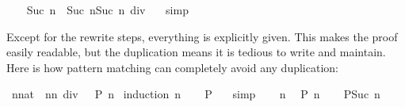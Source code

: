 \begin{isabellebody}
\ \ \isamarkupfalse%
\ {}{}{}{}{}{}Suc\ n{}\ {}\ Suc\ n{}{}Suc\ n{}{}{}\ div\ {}{}\ \isamarkupfalse%
\ simp\isanewline
{}\isamarkupfalse%
%
\endisatagproof
{\isafoldproof}%
%
\isadelimproof
%
\endisadelimproof
%
\begin{isamarkuptext}%
Except for the rewrite steps, everything is explicitly given. This
makes the proof easily readable, but the duplication means it is tedious to
write and maintain. Here is how pattern
matching can completely avoid any duplication:%
\end{isamarkuptext}%
\isamarkuptrue%
\isamarkupfalse%
\ {}{}{}{}{}{}n{}{}nat{}\ {}\ n{}{}n{}{}{}\ div\ {}{}\ {}\ {}{}P\ n{}{}\isanewline
%
\isadelimproof
%
\endisadelimproof
%
\isatagproof
{}\isamarkupfalse%
\ {}induction\ n{}\isanewline
\ \ \isamarkupfalse%
\ {}{}P\ {}{}\ \isamarkupfalse%
\ simp\isanewline
{}\isamarkupfalse%
\isanewline
\ \ \isamarkupfalse%
\ n\ \isamarkupfalse%
\ {}{}P\ n{}\isanewline
\ \ \isamarkupfalse%
\ {}{}P{}Suc\ n{}{}\ \isamarkupfalse%

\end{isabellebody}
